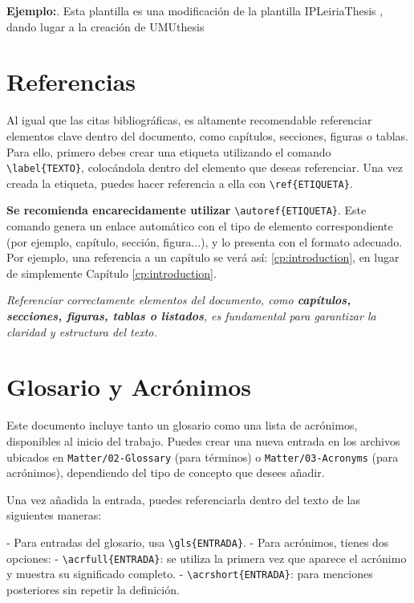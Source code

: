 \noindent\textbf{Ejemplo:}. Esta plantilla es una modificación de la plantilla IPLeiriaThesis \cite{IPLeiriaThesis}, dando lugar a la creación de UMUthesis \cite{UMU_Thesis}

\section{Referencias}

Al igual que las citas bibliográficas, es altamente recomendable referenciar elementos clave dentro del documento, como capítulos, secciones, figuras o tablas. Para ello, primero debes crear una etiqueta utilizando el comando \verb|\label{TEXTO}|, colocándola dentro del elemento que deseas referenciar. Una vez creada la etiqueta, puedes hacer referencia a ella con \verb|\ref{ETIQUETA}|.

\textbf{Se recomienda encarecidamente utilizar} \verb|\autoref{ETIQUETA}|. Este comando genera un enlace automático con el tipo de elemento correspondiente (por ejemplo, capítulo, sección, figura...), y lo presenta con el formato adecuado. Por ejemplo, una referencia a un capítulo se verá así: \autoref{cp:introduction}, en lugar de simplemente Capítulo \ref{cp:introduction}.

\begin{block}[tip]
\textit{Referenciar correctamente elementos del documento, como \textbf{capítulos, secciones, figuras, tablas o listados}, es fundamental para garantizar la claridad y estructura del texto.}
\end{block}

\section{Glosario y Acrónimos}

Este documento incluye tanto un glosario como una lista de acrónimos, disponibles al inicio del trabajo. Puedes crear una nueva entrada en los archivos ubicados en \verb|Matter/02-Glossary| (para términos) o \verb|Matter/03-Acronyms| (para acrónimos), dependiendo del tipo de concepto que desees añadir.

Una vez añadida la entrada, puedes referenciarla dentro del texto de las siguientes maneras:

- Para entradas del glosario, usa \verb|\gls{ENTRADA}|.
- Para acrónimos, tienes dos opciones:
  - \verb|\acrfull{ENTRADA}|: se utiliza la primera vez que aparece el acrónimo y muestra su significado completo.
  - \verb|\acrshort{ENTRADA}|: para menciones posteriores sin repetir la definición.

